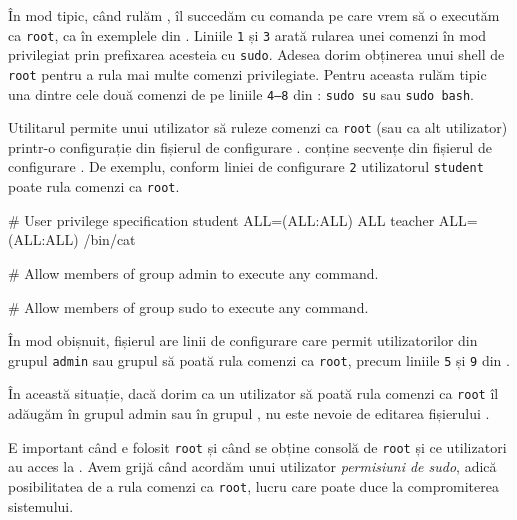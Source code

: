 În mod tipic, când rulăm , îl succedăm cu comanda pe care vrem să o
executăm ca \texttt{root}, ca în exemplele din . Liniile \texttt{1} și \texttt{3} arată rularea unei comenzi în mod privilegiat prin prefixarea acesteia cu \texttt{sudo}.
Adesea dorim obținerea unui shell de \texttt{root} pentru a rula mai multe comenzi
privilegiate. Pentru aceasta rulăm tipic una dintre cele două comenzi de pe liniile \texttt{4--8} din : \texttt{sudo su} sau \texttt{sudo bash}.


Utilitarul  permite unui utilizator să ruleze comenzi ca \texttt{root} (sau ca alt
utilizator) printr-o configurație din fișierul de configurare
.  conține secvențe din fișierul de configurare . De exemplu, conform liniei de configurare \texttt{2} utilizatorul \texttt{student} poate rula comenzi ca \texttt{root}.

\begin{screen}[caption={Secvențe din fișierul /etc/sudoers},label={lst:user:sudoers}]
# User privilege specification
student ALL=(ALL:ALL) ALL
teacher ALL=(ALL:ALL) /bin/cat

# Allow members of group admin to execute any command.

# Allow members of group sudo to execute any command.
\end{screen}

În mod obișnuit, fișierul  are linii de configurare care permit
utilizatorilor din grupul \texttt{admin} sau grupul  să poată rula comenzi ca \texttt{root}, precum liniile \texttt{5} și \texttt{9} din .

În această situație, dacă dorim ca un utilizator să poată rula comenzi ca \texttt{root} îl
adăugăm în grupul admin sau în grupul , nu este nevoie de editarea
fișierului .

\begin{note}
E important când e folosit \texttt{root} și când se obține consolă de \texttt{root} și ce
utilizatori au acces la . Avem grijă când acordăm unui utilizator
\textit{permisiuni de sudo}, adică posibilitatea de a rula comenzi ca \texttt{root}, lucru care
poate duce la compromiterea sistemului.
\end{note}

